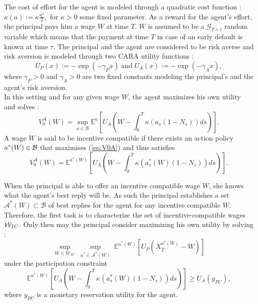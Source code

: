 \documentclass[numbook, envcountsect, envcountsame, envcountreset, runningheads, smallextended]{article}
\def \E{\mathbb{E}}
\def\Bc{{\cal B}}
\def\Wc{{\cal W}}
\begin{document}
  The cost of effort for the agent is modeled through a quadratic cost function : 
$ \kappa(a) :=  \kappa \frac{a^2}{2},$
for $\kappa>0$ some fixed parameter. As a reward for the agent's effort, the principal pays him a wage $W$ at time $T$.  $W$ is assumed to be a $\mathcal{G}_{T\wedge \tau}$ random variable which means that the payment at time $T$ in case of an early default is known at time $\tau$.
The principal and the agent are considered to be risk averse and risk aversion is modeled through two  CARA utility functions  : 
$$ U_P(x) := -\exp(-\gamma_P x) \; \text{and} \; U_A(x) := -\exp(-\gamma_A x) ,$$
where $\gamma_P > 0$ and $\gamma_A > 0$ are two fixed constants modeling the principal's and the agent's risk aversion. \\




 
In this setting and for any given wage $W $, the agent maximizes his own utility and solves : 
\begin{equation}
\label{eq:V0A}
V_0^A(W) = \sup_{a \in \mathcal{B}} \E^{a}\left[ U_A\left(W - \int_0^T \kappa(a_s(1-N_s)) ds \right) \right].
\end{equation}
A wage $W$ is said to be incentive compatible if there exists an action policy $a^*(W) \in \Bc$ that maximises (\ref{eq:V0A}) and thus satisfies
$$ V_0^A(W) =  \E^{a^*(W)}\left[ U_A\left(W - \int_0^T \kappa(a_s^*(W)(1-N_s)) ds \right) \right].$$

When the principal is able to offer an incentive compatible wage $W$, she knows what the agent's best reply will be. As such the principal establishes a set $\mathcal{A}^*(W) \subset \mathcal{B}$ of best replies for the agent for any incentive compatible $W$. Therefore, the first task is to characterize the set of incentive-compatible wages $\Wc_{IC}$. 
Only then may the principal consider maximizing his own utility by solving :
\begin{equation}
\label{eq:pbMHa}
\sup_{W \in \mathcal{W}_{IC}} \; \sup_{a^* \in \mathcal{A}^*(W)} \; \E^{{a^*}(W)}\left[U_P\left(X^{a^*{(W)}}_T-W\right)\right]
\end{equation}
under the participation constraint 
\begin{equation}
\label{eq:PC}
\E^{{a^*}(W)}\left[U_A\left(W-\int_0^T\kappa(a_s^*(W)(1-N_s))ds\right)\right] \geq U_A(y_{PC}),
\end{equation}
where $y_{PC}$ is a monetary reservation utility for the agent.
\end{document}
